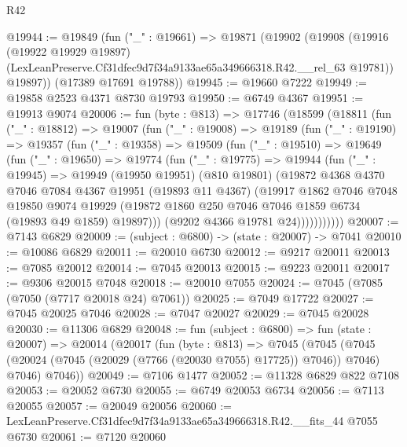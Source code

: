 \begin{lexlean}{R42}
\begin{coremodule}
{@19944 := @19849
    (fun ("_" : @19661) =>
    @19871
      (@19902
        (@19908
          (@19916
            (@19922 @19929 @19897)
            (LexLeanPreserve.Cf31dfec9d7f34a9133ae65a349666318.R42.__rel_63 @19781))
          @19897))
      (@17389 @17691 @19788))
@19945 := @19660 @7222
@19949 := @19858 @2523 @4371 @8730 @19793
@19950 := @6749 @4367
@19951 := @19913 @9074
@20006 := fun (byte : @813) =>
  @17746
    (@18599
      (@18811
        (fun ("_" : @18812) =>
        @19007
          (fun ("_" : @19008) =>
          @19189
            (fun ("_" : @19190) =>
            @19357
              (fun ("_" : @19358) =>
              @19509
                (fun ("_" : @19510) =>
                @19649
                  (fun ("_" : @19650) =>
                  @19774
                    (fun ("_" : @19775) =>
                    @19944
                      (fun ("_" : @19945) =>
                      @19949
                        (@19950 @19951)
                        (@810 @19801)
                        (@19872
                          @4368
                          @4370
                          @7046
                          @7084
                          @4367
                          @19951
                          (@19893 @11 @4367)
                          (@19917
                            @1862
                            @7046
                            @7048
                            @19850
                            @9074
                            @19929
                            (@19872 @1860 @250 @7046 @7046 @1859 @6734 (@19893 @49 @1859) @19897)))
                        (@9202 @4366 @19781 @24)))))))))))
@20007 := @7143 @6829
@20009 := (subject : @6800) -> (state : @20007) -> @7041
@20010 := @10086 @6829
@20011 := @20010 @6730
@20012 := @9217 @20011
@20013 := @7085 @20012
@20014 := @7045 @20013
@20015 := @9223 @20011
@20017 := @9306 @20015 @7048
@20018 := @20010 @7055
@20024 := @7045 (@7085 (@7050 (@7717 @20018 @24) @7061))
@20025 := @7049 @17722
@20027 := @7045 @20025 @7046
@20028 := @7047 @20027
@20029 := @7045 @20028
@20030 := @11306 @6829
@20048 := fun (subject : @6800) =>
  fun (state : @20007) =>
  @20014
    (@20017
      (fun (byte : @813) =>
      @7045
        (@7045 (@7045 (@20024 (@7045 (@20029 (@7766 (@20030 @7055) @17725)) @7046)) @7046) @7046)
        @7046))
@20049 := @7106 @1477
@20052 := @11328 @6829 @822 @7108
@20053 := @20052 @6730
@20055 := @6749 @20053 @6734
@20056 := @7113 @20055
@20057 := @20049 @20056
@20060 := LexLeanPreserve.Cf31dfec9d7f34a9133ae65a349666318.R42.__fits_44 @7055 @6730
@20061 := @7120 @20060
}
\end{coremodule}
\end{lexlean}
